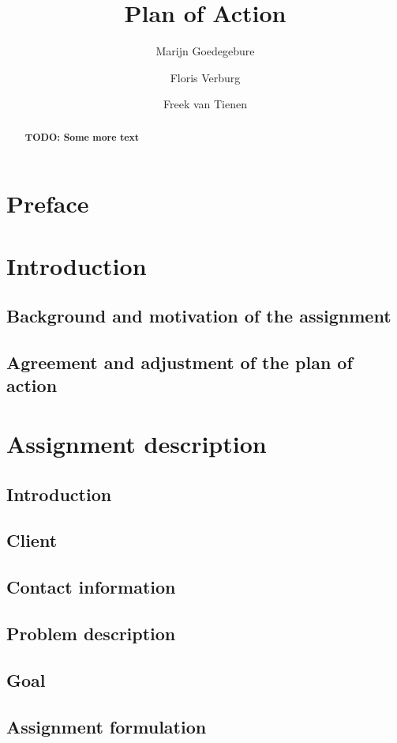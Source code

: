 \documentclass[]{article}
\title{Plan of Action}
\author{Marijn Goedegebure \and
	Floris Verburg \and
	Freek van Tienen}
\date{}
\newcommand{\TODO}[1]{{\color{red}\textbf{TODO: #1}}}
\begin{document}
\maketitle

\begin{abstract}
\TODO{Some more text}
\end{abstract}

\newpage

\tableofcontents

\newpage
\section{Preface}
\section{Introduction}
\subsection{Background and motivation of the assignment}
\subsection{Agreement and adjustment of the plan of action}
\section{Assignment description}
\subsection{Introduction}
\subsection{Client}
\subsection{Contact information}
\subsection{Problem description}
\subsection{Goal}
\subsection{Assignment formulation}
\end{document}
